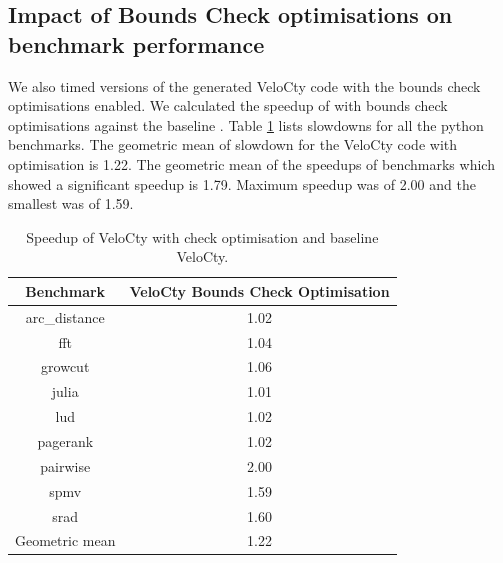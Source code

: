 \subsection{Impact of Bounds Check optimisations on benchmark performance}
We also timed versions of the generated VeloCty code with the bounds check optimisations enabled. We calculated the speedup of \velocty with bounds check optimisations against the baseline \velocty. Table \ref{tab:cwvscopy} lists slowdowns for all the python benchmarks. The geometric mean of slowdown for the VeloCty code with optimisation is 1.22. The geometric mean of the speedups of benchmarks which showed a significant speedup is 1.79. Maximum speedup was of 2.00 and the smallest was of 1.59. 
\begin{table}[h]
\centering
\begin{tabular}{|c|c|}
\hline
Benchmark      & VeloCty Bounds Check Optimisation \\ \hline
arc\_distance  & 1.02                              \\ \hline
fft            & 1.04                              \\ \hline
growcut        & 1.06                              \\ \hline
julia          & 1.01                              \\ \hline
lud            & 1.02                              \\ \hline
pagerank       & 1.02                              \\ \hline
pairwise       & 2.00                              \\ \hline
spmv           & 1.59                              \\ \hline
srad           & 1.60                              \\ \hline
Geometric mean & 1.22                              \\ \hline
\end{tabular}
\caption{Speedup of VeloCty with check optimisation and baseline VeloCty.}
\label{tab:cwvscopy}
\end{table}
